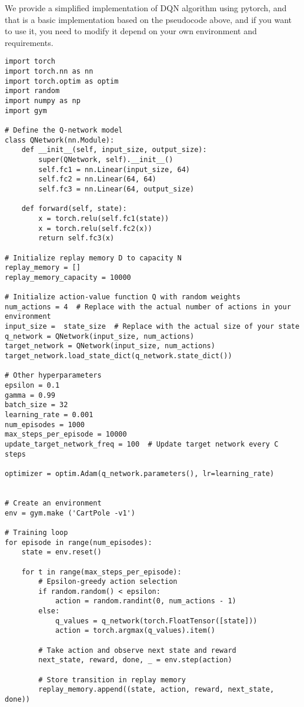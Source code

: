 \documentclass{article}
\begin{document}
We provide a simplified implementation of DQN algorithm using pytorch, and that is a basic implementation based on the pseudocode above, and if you want to use it, you need to modify it depend on your own environment and requirements.

\begin{lstlisting}
import torch
import torch.nn as nn
import torch.optim as optim
import random
import numpy as np
import gym

# Define the Q-network model
class QNetwork(nn.Module):
    def __init__(self, input_size, output_size):
        super(QNetwork, self).__init__()
        self.fc1 = nn.Linear(input_size, 64)
        self.fc2 = nn.Linear(64, 64)
        self.fc3 = nn.Linear(64, output_size)

    def forward(self, state):
        x = torch.relu(self.fc1(state))
        x = torch.relu(self.fc2(x))
        return self.fc3(x)

# Initialize replay memory D to capacity N
replay_memory = []
replay_memory_capacity = 10000

# Initialize action-value function Q with random weights
num_actions = 4  # Replace with the actual number of actions in your environment
input_size =  state_size  # Replace with the actual size of your state
q_network = QNetwork(input_size, num_actions)
target_network = QNetwork(input_size, num_actions)
target_network.load_state_dict(q_network.state_dict())

# Other hyperparameters
epsilon = 0.1
gamma = 0.99
batch_size = 32
learning_rate = 0.001
num_episodes = 1000
max_steps_per_episode = 10000
update_target_network_freq = 100  # Update target network every C steps

optimizer = optim.Adam(q_network.parameters(), lr=learning_rate)


# Create an environment
env = gym.make ('CartPole -v1')

# Training loop
for episode in range(num_episodes):
    state = env.reset()

    for t in range(max_steps_per_episode):
        # Epsilon-greedy action selection
        if random.random() < epsilon:
            action = random.randint(0, num_actions - 1)
        else:
            q_values = q_network(torch.FloatTensor([state]))
            action = torch.argmax(q_values).item()

        # Take action and observe next state and reward
        next_state, reward, done, _ = env.step(action)

        # Store transition in replay memory
        replay_memory.append((state, action, reward, next_state, done))


\end{lstlisting}
\end{document}
